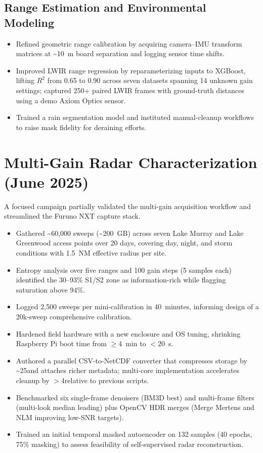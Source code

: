 \documentclass[12pt]{article}
\begin{document}
\subsection{Range Estimation and Environmental Modeling}
\begin{itemize}[leftmargin=*,nosep]
  \item Refined geometric range calibration by acquiring camera--IMU transform matrices at \textasciitilde10~m board separation and logging sensor time shifts.
  \item Improved LWIR range regression by reparameterizing inputs to XGBoost, lifting $R^2$ from 0.65 to 0.90 across seven datasets spanning 14 unknown gain settings; captured 250+ paired LWIR frames with ground-truth distances using a demo Axiom Optics sensor.
  \item Trained a rain segmentation model and instituted manual-cleanup workflows to raise mask fidelity for deraining efforts.
\end{itemize}

\section{Multi-Gain Radar Characterization (June 2025)}
A focused campaign partially validated the multi-gain acquisition workflow and streamlined the Furuno NXT capture stack.\cite{phase2-gain}
\begin{itemize}[leftmargin=*,nosep]
  \item Gathered \textasciitilde60{,}000 sweeps (\textasciitilde200~GB) across seven Lake Murray and Lake Greenwood access points over 20 days, covering day, night, and storm conditions with 1.5~NM effective radius per site.
  \item Entropy analysis over five ranges and 100 gain steps (5 samples each) identified the 30--93\% S1/S2 zone as information-rich while flagging saturation above 94\%.
  \item Logged 2{,}500 sweeps per mini-calibration in 40~minutes, informing design of a 20k-sweep comprehensive calibration.
  \item Hardened field hardware with a new enclosure and OS tuning, shrinking Raspberry Pi boot time from $\ge$4~min to $<20$~s.
  \item Authored a parallel CSV-to-NetCDF converter that compresses storage by \textasciitilde25\times and attaches richer metadata; multi-core implementation accelerates cleanup by $>$4\times relative to previous scripts.
  \item Benchmarked six single-frame denoisers (BM3D best) and multi-frame filters (multi-look median leading) plus OpenCV HDR merges (Merge Mertens and NLM improving low-SNR targets).
  \item Trained an initial temporal masked autoencoder on 132 samples (40 epochs, 75\% masking) to assess feasibility of self-supervised radar reconstruction.
\end{itemize}
\end{document}
